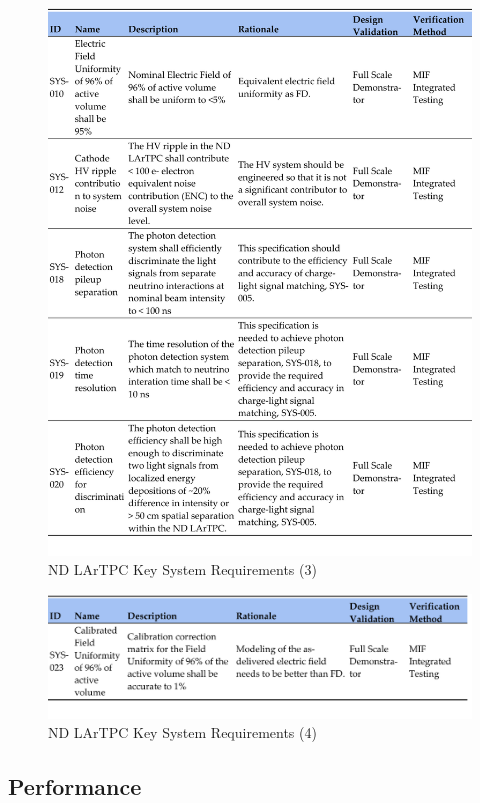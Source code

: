 \begin{figure}
\centering 
\includegraphics[width=1\linewidth]{graphics/lartpc/0Req/NDreqs3.pdf}
\caption{\label{fig:lartpcreq3} ND LArTPC Key System Requirements (3)}
\end{figure}
\begin{figure}
\centering 
\includegraphics[width=1\linewidth]{graphics/lartpc/0Req/NDreqs4.pdf}
\caption{\label{fig:lartpcreq4} ND LArTPC Key System Requirements (4)}
\end{figure}

\subsection{Performance}
\label{sec:lartpc-ovvw-perf}

